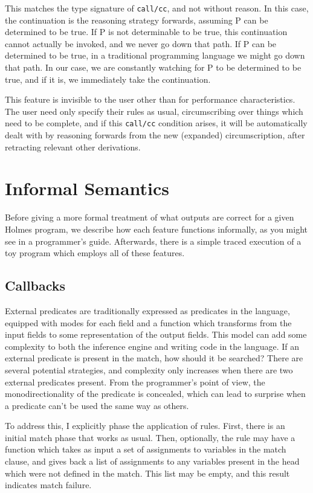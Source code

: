 This matches the type signature of \texttt{call/cc}, and not without reason.
In this case, the continuation is the reasoning strategy forwards, assuming P can be determined to be true.
If P is not determinable to be true, this continuation cannot actually be invoked, and we never go down that path.
If P can be determined to be true, in a traditional programming language we might go down that path.
In our case, we are constantly watching for P to be determined to be true, and if it is, we immediately take the continuation.

This feature is invisible to the user other than for performance characteristics.
The user need only specify their rules as usual, circumscribing over things which need to be complete, and if this \texttt{call/cc} condition arises, it will be automatically dealt with by reasoning forwards from the new (expanded) circumscription, after retracting relevant other derivations.

\section{Informal Semantics}
Before giving a more formal treatment of what outputs are correct for a given Holmes program, we describe how each feature functions informally, as you might see in a programmer's guide.
Afterwards, there is a simple traced execution of a toy program which employs all of these features.

\subsection{Callbacks}
External predicates are traditionally expressed as predicates in the language, equipped with modes for each field and a function which transforms from the input fields to some representation of the output fields.
This model can add some complexity to both the inference engine and writing code in the language.
If an external predicate is present in the match, how should it be searched?
There are several potential strategies, and complexity only increases when there are two external predicates present.
From the programmer's point of view, the monodirectionality of the predicate is concealed, which can lead to surprise when a predicate can't be used the same way as others.

To address this, I explicitly phase the application of rules.
First, there is an initial match phase that works as usual.
Then, optionally, the rule may have a function which takes as input a set of assignments to variables in the match clause, and gives back a list of assignments to any variables present in the head which were not defined in the match.
This list may be empty, and this result indicates match failure.

